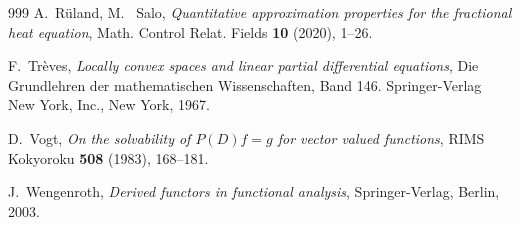 \documentclass[12pt]{amsart}
\theoremstyle{definition}
\theoremstyle{remark}
\numberwithin{equation}{section}
\begin{document}
\begin{thebibliography}{999}
A.~R\"{u}land, M.~ Salo, \emph{Quantitative approximation properties for the fractional heat equation}, Math. Control Relat. Fields \textbf{10} (2020), 1--26.

F.~Tr\`eves, \emph{Locally convex spaces and linear partial differential equations}, Die Grundlehren der mathematischen Wissenschaften, Band 146.
Springer-Verlag New York, Inc., New York, 1967.

 D.~Vogt, \emph{On the solvability of $P(D) f = g$ for vector valued functions}, RIMS Kokyoroku \textbf{508} (1983), 168--181.

 J.~Wengenroth, \emph{Derived functors in functional analysis}, Springer-Verlag, Berlin, 2003.



\end{thebibliography}
\end{document}
